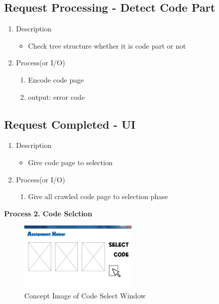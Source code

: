 \documentclass[conference]{IEEEtran}
\begin{document}
\subsection{Request Processing - Detect Code Part}
\begin{enumerate}
\item Description
  \begin{itemize}
    \item Check tree structure whether it is code part or not
  \end{itemize}
  \item Process(or I/O)
  \begin{enumerate}
    \item Encode code page
    \item output: error code
  \end{enumerate}
\end{enumerate}
\textit{}


\subsection{Request Completed - UI}
\begin{enumerate}
  \item Description
  \begin{itemize}
    \item Give code page to selection
  \end{itemize}
  \item Process(or I/O)
  \begin{enumerate}
    \item Give all crawled code page to selection phase
  \end{enumerate}
\end{enumerate}

\textit{}

\textbf{Process 2. Code Selction}


\textit{}
\begin{figure}[h]
\centering
\includegraphics[width=0.5\textwidth]{./figures/UI_code_select.jpg}
\caption{Concept Image of Code Select Window}
\label{fig_concept_code_select}
\end{figure}
\end{document}
